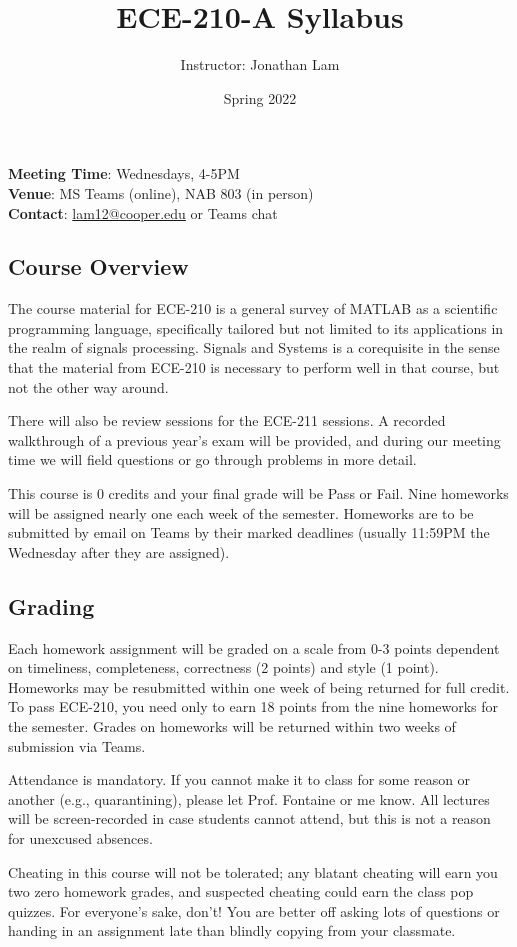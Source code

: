 \documentclass{article}
\title{ECE-210-A Syllabus}
\author{Instructor: Jonathan Lam}
\date{Spring 2022}
\begin{document}
\maketitle
\noindent\textbf{Meeting Time}: Wednesdays, 4-5PM \\
\textbf{Venue}: MS Teams (online), NAB 803 (in person) \\
\textbf{Contact}: \href{mailto:lam12@cooper.edu}{lam12@cooper.edu} or Teams chat

\subsection*{Course Overview}
The course material for ECE-210 is a general survey of MATLAB as a scientific programming language, specifically tailored but not limited to its applications in the realm of signals processing. Signals and Systems is a corequisite in the sense that the material from ECE-210 is necessary to perform well in that course, but not the other way around.

There will also be review sessions for the ECE-211 sessions. A recorded walkthrough of a previous year's exam will be provided, and during our meeting time we will field questions or go through problems in more detail.

This course is 0 credits and your final grade will be Pass or Fail. Nine homeworks will be assigned nearly one each week of the semester. Homeworks are to be submitted by email on Teams by their marked deadlines (usually 11:59PM the Wednesday after they are assigned).

\subsection*{Grading}
Each homework assignment will be graded on a scale from 0-3 points dependent on timeliness, completeness, correctness (2 points) and style (1 point). Homeworks may be resubmitted within one week of being returned for full credit. To pass ECE-210, you need only to earn 18 points from the nine homeworks for the semester. Grades on homeworks will be returned within two weeks of submission via Teams.

Attendance is mandatory. If you cannot make it to class for some reason or another (e.g., quarantining), please let Prof. Fontaine or me know. All lectures will be screen-recorded in case students cannot attend, but this is not a reason for unexcused absences.

Cheating in this course will not be tolerated; any blatant cheating will earn you two zero homework grades, and suspected cheating could earn the class pop quizzes. For everyone's sake, don't! You are better off asking lots of questions or handing in an assignment late than blindly copying from your classmate.
\end{document}
